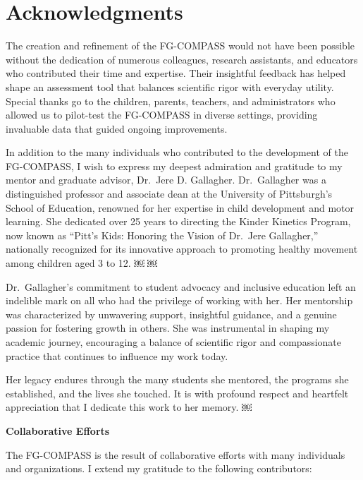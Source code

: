 \documentclass[
  letterpaper,
  DIV=11,
  numbers=noendperiod]{scrreprt}
\begin{document}
\section*{Acknowledgments}\label{acknowledgments}


The creation and refinement of the FG-COMPASS would not have been
possible without the dedication of numerous colleagues, research
assistants, and educators who contributed their time and expertise.
Their insightful feedback has helped shape an assessment tool that
balances scientific rigor with everyday utility. Special thanks go to
the children, parents, teachers, and administrators who allowed us to
pilot-test the FG-COMPASS in diverse settings, providing invaluable data
that guided ongoing improvements.

In addition to the many individuals who contributed to the development
of the FG-COMPASS, I wish to express my deepest admiration and gratitude
to my mentor and graduate advisor, Dr.~Jere D. Gallagher. Dr.~Gallagher
was a distinguished professor and associate dean at the University of
Pittsburgh's School of Education, renowned for her expertise in child
development and motor learning. She dedicated over 25 years to directing
the Kinder Kinetics Program, now known as ``Pitt's Kids: Honoring the
Vision of Dr.~Jere Gallagher,'' nationally recognized for its innovative
approach to promoting healthy movement among children aged 3 to 12. ￼ ￼

Dr.~Gallagher's commitment to student advocacy and inclusive education
left an indelible mark on all who had the privilege of working with her.
Her mentorship was characterized by unwavering support, insightful
guidance, and a genuine passion for fostering growth in others. She was
instrumental in shaping my academic journey, encouraging a balance of
scientific rigor and compassionate practice that continues to influence
my work today.

Her legacy endures through the many students she mentored, the programs
she established, and the lives she touched. It is with profound respect
and heartfelt appreciation that I dedicate this work to her memory. ￼

\textbf{Collaborative Efforts}

The FG-COMPASS is the result of collaborative efforts with many
individuals and organizations. I extend my gratitude to the following
contributors:
\end{document}
